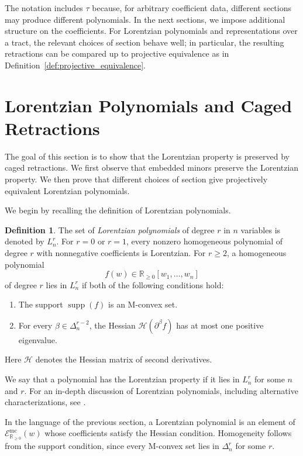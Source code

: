 \documentclass[11pt]{article}
\theoremstyle{definition}
\newtheorem{definition}[theorem]{Definition}
\theoremstyle{remark}
\newcommand{\dnr}{\Delta_n^r}
\newcommand{\R}{\mathbb{R}}
\DeclareMathOperator{\supp}{supp}
\newcommand{\hess}{\mathcal{H}}
\newcommand{\Lnr}{L_n^r}
\begin{document}
The notation includes $\tau$ because, for arbitrary coefficient data, different sections may produce different polynomials. In the next sections, we impose additional structure on the coefficients. For Lorentzian polynomials and representations over a tract, the relevant choices of section behave well; in particular, the resulting retractions can be compared up to projective equivalence as in Definition~\ref{def:projective_equivalence}.



\section{Lorentzian Polynomials and Caged Retractions}
\label{section:lorentzian_polynomials}

The goal of this section is to show that the Lorentzian property is preserved by caged retractions. We first observe that embedded minors preserve the Lorentzian property. We then prove that different choices of section give projectively equivalent Lorentzian polynomials.

We begin by recalling the definition of Lorentzian polynomials.

\begin{definition}\label{def:lorentzian_poly}
    The set of \emph{Lorentzian polynomials} of degree $r$ in $n$ variables is denoted by $\Lnr$. For $r=0$ or $r=1$, every nonzero homogeneous polynomial of degree
    $r$ with nonnegative coefficients is Lorentzian. For $r \geq 2$, a homogeneous polynomial
    \[
        f(w)\in\R_{\geq 0}[w_1,\dots,w_n]
    \]
    of degree $r$ lies in $\Lnr$ if both of the following conditions hold:
    \begin{enumerate}
        \item The support $\supp(f)$ is an M-convex set.
        \item For every $\beta\in\Delta_n^{r-2}$, the Hessian $\hess(\partial^\beta f)$ has at most one positive eigenvalue.
    \end{enumerate}
    Here $\hess$ denotes the Hessian matrix of second derivatives.
\end{definition}

We say that a polynomial has the Lorentzian property if it lies in $\Lnr$ for some $n$ and $r$. For an in-depth discussion of Lorentzian polynomials, including alternative characterizations, see \cite{branden2024lorentzianpolynomials}.

In the language of the previous section, a Lorentzian polynomial is an element of $\mathcal{E}^{\mathrm{mc}}_{\R_{\geq 0}}(w)$ whose coefficients satisfy the Hessian condition. Homogeneity follows from the support condition, since every M-convex set lies in $\dnr$ for some $r$.
\end{document}
